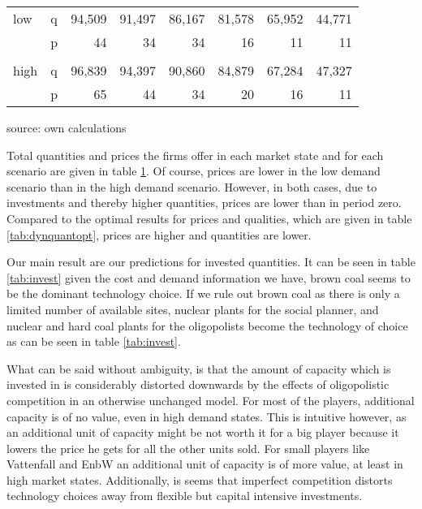 \begin{table}
\begin{tabular}{llrrrrrr}
       low &          q &     94,509 &     91,497 &     86,167 &     81,578 &     65,952 &     44,771 \\

           &          p &         44 &         34 &         34 &         16 &         11 &         11 \\

           &            &            &            &            &            &            &            \\

      high &          q &     96,839 &     94,397 &     90,860 &     84,879 &     67,284 &     47,327 \\

           &          p &         65 &         44 &         34 &         20 &         16 &         11 \\
\hline
\hline
\end{tabular}  

\label{tab:dynquant}
\begin{center}
source: own calculations
\end{center}
\end{table}


Total quantities and prices the firms offer in each market state and for each scenario are given in table \ref{tab:dynquant}. Of course, prices are lower in the low demand scenario than in the high demand scenario. However, in both cases, due to investments and thereby higher quantities, prices are lower than in period zero.
Compared to the optimal results for prices and qualities, which are given in table \ref{tab:dynquantopt}, prices are higher and quantities are lower.

Our main result are our predictions for invested quantities. It can be seen in table \ref{tab:invest} given the cost and demand information we have, brown coal seems to be the dominant technology choice. If we rule out brown coal as there is only a limited number of available sites, nuclear plants for the social planner, and nuclear and hard coal plants for the oligopolists become the technology of choice as can be seen in table \ref{tab:invest}.

What can be said without ambiguity, is that the amount of capacity which is invested in is considerably distorted downwards by the effects of oligopolistic competition in an otherwise unchanged model. For most of the players, additional capacity is of no value, even in high demand states. This is intuitive however, as an additional unit of capacity might be not worth it for a big player because it lowers the price he gets for all the other units sold. For small players like Vattenfall and EnbW an additional unit of capacity is of more value, at least in high market states. Additionally, is seems that imperfect competition distorts technology choices away from flexible but capital intensive investments.

